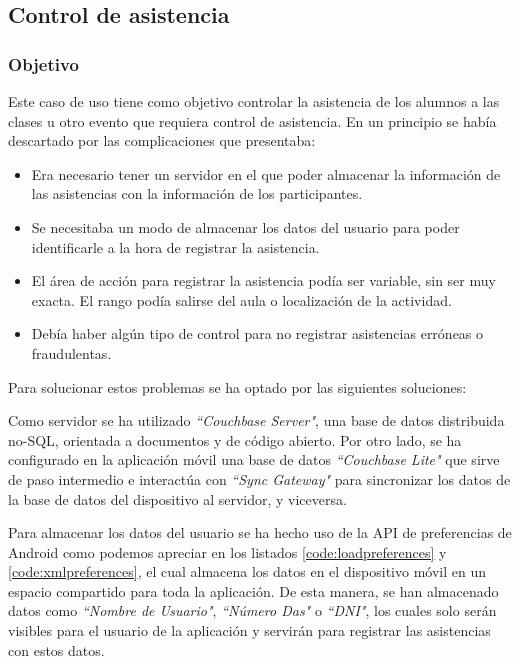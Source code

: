 \subsection{Control de asistencia}

\subsubsection{Objetivo}

Este caso de uso tiene como objetivo controlar la asistencia de los alumnos a las clases u otro evento que requiera control de asistencia. En un principio se había descartado por las complicaciones que presentaba: 

\begin{itemize}
\item Era necesario tener un servidor en el que poder almacenar la información de las asistencias con la información de los participantes.
\item Se necesitaba un modo de almacenar los datos del usuario para poder identificarle a la hora de registrar la asistencia.
\item El área de acción para registrar la asistencia podía ser variable, sin ser muy exacta. El rango podía salirse del aula o localización de la actividad.
\item Debía haber algún tipo de control para no registrar asistencias erróneas o fraudulentas.
\end{itemize}

Para solucionar estos problemas se ha optado por las siguientes soluciones: 

Como servidor se ha utilizado \textit{``Couchbase Server"}, una base de datos distribuida no-SQL, orientada a documentos y de código abierto. Por otro lado, se ha configurado en la aplicación móvil una base de datos \textit{``Couchbase Lite"} que sirve de paso intermedio e interactúa con \textit{``Sync Gateway"} para sincronizar los datos de la base de datos del dispositivo al servidor, y viceversa.


Para almacenar los datos del usuario se ha hecho uso de la API de preferencias de Android como podemos apreciar en los listados \ref{code:loadpreferences} y \ref{code:xmlpreferences}, el cual almacena los datos en el dispositivo móvil en un espacio compartido para toda la aplicación. De esta manera, se han almacenado datos como \textit{``Nombre de Usuario"}, \textit{``Número Das"} o \textit{``DNI"}, los cuales solo serán visibles para el usuario de la aplicación y servirán para registrar las asistencias con estos datos.

